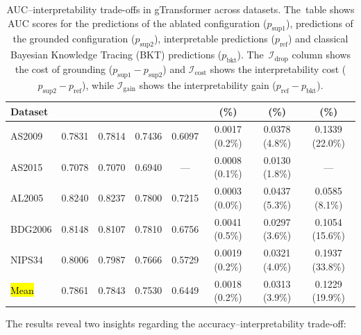 \documentclass[applsci,article,accept,moreauthors,pdftex]{Definitions/mdpi}
\begin{document}
\begin{table}[H]
\centering
\small
\caption{AUC--interpretability trade-offs in gTransformer across datasets. The~table shows AUC scores for the predictions of the ablated configuration ($p_{\text{sup}1}$), predictions of the grounded configuration ($p_{\text{sup}2}$), interpretable predictions ($p_{\text{ref}}$) and classical Bayesian Knowledge Tracing (BKT) predictions ($p_{\text{bkt}}$). The~$\mathcal{I}_{\text{drop}}$ column shows the cost of grounding ($p_{\text{sup}1} - p_{\text{sup}2}$) and $\mathcal{I}_{\text{cost}}$ shows the interpretability cost ($p_{\text{sup}2} - p_{\text{ref}}$), while $\mathcal{I}_{\text{gain}}$ shows the interpretability gain ($p_{\text{ref}} - p_{\text{bkt}}$).}
\label{tab:tradeoff}
\begin{tabularx}{\textwidth}{LcCccccc}
\toprule
\textbf{Dataset} &  &  &  &  &  \textbf{(\%)} &  \textbf{(\%)} &  \textbf{(\%)} \\
\midrule
AS2009 & 0.7831 & 0.7814 & 0.7436 & 0.6097 & 0.0017 (0.2\%) & 0.0378 (4.8\%) & 0.1339 (22.0\%) \\
AS2015 & 0.7078 & 0.7070 & 0.6940 & --- & 0.0008 (0.1\%) & 0.0130 (1.8\%) & --- \\
AL2005 & 0.8240 & 0.8237 & 0.7800 & 0.7215 & 0.0003 (0.0\%) & 0.0437 (5.3\%) & 0.0585 (8.1\%) \\
BDG2006 & 0.8148 & 0.8107 & 0.7810 & 0.6756 & 0.0041 (0.5\%) & 0.0297 (3.6\%) & 0.1054 (15.6\%) \\
NIPS34 & 0.8006 & 0.7987 & 0.7666 & 0.5729 & 0.0019 (0.2\%) & 0.0321 (4.0\%) & 0.1937 (33.8\%) \\
\midrule
\hl{Mean}%
 & 0.7861 & 0.7843 & 0.7530 & 0.6449 & 0.0018 (0.2\%) & 0.0313 (3.9\%) & 0.1229 (19.9\%) \\
\bottomrule
\end{tabularx}
\end{table}

The results reveal two insights regarding the accuracy--interpretability trade-off:
\end{document}
